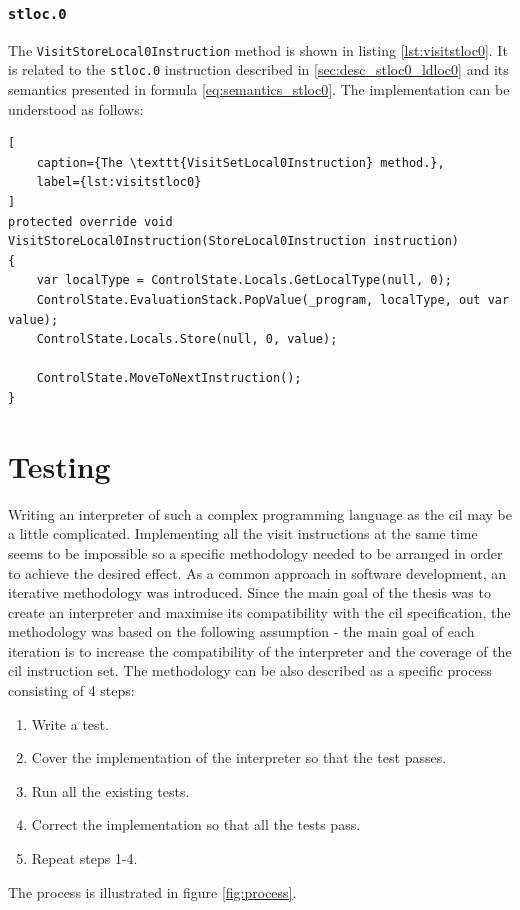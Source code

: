 \documentclass{article}
\numberwithin{equation}{section}
\begin{document}
\subsubsection{\texttt{stloc.0}}

The \texttt{VisitStoreLocal0Instruction} method is shown in listing \ref{lst:visitstloc0}. It is related to the \texttt{stloc.0} instruction described in \ref{sec:desc_stloc0_ldloc0} and its semantics presented in formula \ref{eq:semantics_stloc0}. The implementation can be understood as follows:


\begin{lstlisting}[
	caption={The \texttt{VisitSetLocal0Instruction} method.},
	label={lst:visitstloc0}
]
protected override void VisitStoreLocal0Instruction(StoreLocal0Instruction instruction)
{
	var localType = ControlState.Locals.GetLocalType(null, 0);
	ControlState.EvaluationStack.PopValue(_program, localType, out var value);
	ControlState.Locals.Store(null, 0, value);

	ControlState.MoveToNextInstruction();
}
\end{lstlisting}

\clearpage


\section{Testing}
\label{sec:testing}

Writing an interpreter of such a complex programming language as the \acrshort{cil} may be a little complicated. Implementing all the visit instructions at the same time seems to be impossible so a specific methodology needed to be arranged in order to achieve the desired effect. As a common approach in software development, an iterative methodology was introduced. Since the main goal of the thesis was to create an interpreter and maximise its compatibility with the \acrshort{cil} specification, the methodology was based on the following assumption - the main goal of each iteration is to increase the compatibility of the interpreter and the coverage of the \acrshort{cil} instruction set. The methodology can be also described as a specific process consisting of 4 steps:
\begin{enumerate}
	\item{Write a test.}
	\item{Cover the implementation of the interpreter so that the test passes.}
	\item{Run all the existing tests.}
	\item{Correct the implementation so that all the tests pass.}
	\item{Repeat steps 1-4.}
\end{enumerate}
The process is illustrated in figure \ref{fig:process}.
\end{document}
